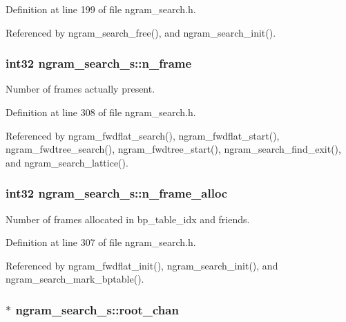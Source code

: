 Definition at line 199 of file ngram\-\_\-search.\-h.



Referenced by ngram\-\_\-search\-\_\-free(), and ngram\-\_\-search\-\_\-init().

\subsubsection[{n\-\_\-frame}]{\setlength{\rightskip}{0pt plus 5cm}int32 ngram\-\_\-search\-\_\-s\-::n\-\_\-frame}\label{structngram__search__s_a5255e56d28c239a4e1d9b1721e8a2f8d}


Number of frames actually present. 



Definition at line 308 of file ngram\-\_\-search.\-h.



Referenced by ngram\-\_\-fwdflat\-\_\-search(), ngram\-\_\-fwdflat\-\_\-start(), ngram\-\_\-fwdtree\-\_\-search(), ngram\-\_\-fwdtree\-\_\-start(), ngram\-\_\-search\-\_\-find\-\_\-exit(), and ngram\-\_\-search\-\_\-lattice().

\subsubsection[{n\-\_\-frame\-\_\-alloc}]{\setlength{\rightskip}{0pt plus 5cm}int32 ngram\-\_\-search\-\_\-s\-::n\-\_\-frame\-\_\-alloc}\label{structngram__search__s_a38ea5de504b3d7ad2390a3f8966d502f}


Number of frames allocated in bp\-\_\-table\-\_\-idx and friends. 



Definition at line 307 of file ngram\-\_\-search.\-h.



Referenced by ngram\-\_\-fwdflat\-\_\-init(), ngram\-\_\-search\-\_\-init(), and ngram\-\_\-search\-\_\-mark\-\_\-bptable().

\subsubsection[{root\-\_\-chan}]{$\ast$ ngram\-\_\-search\-\_\-s\-::root\-\_\-chan}\label{structngram__search__s_ae1b0a51cfcddc1e4b6ac94fa1e48887a}


